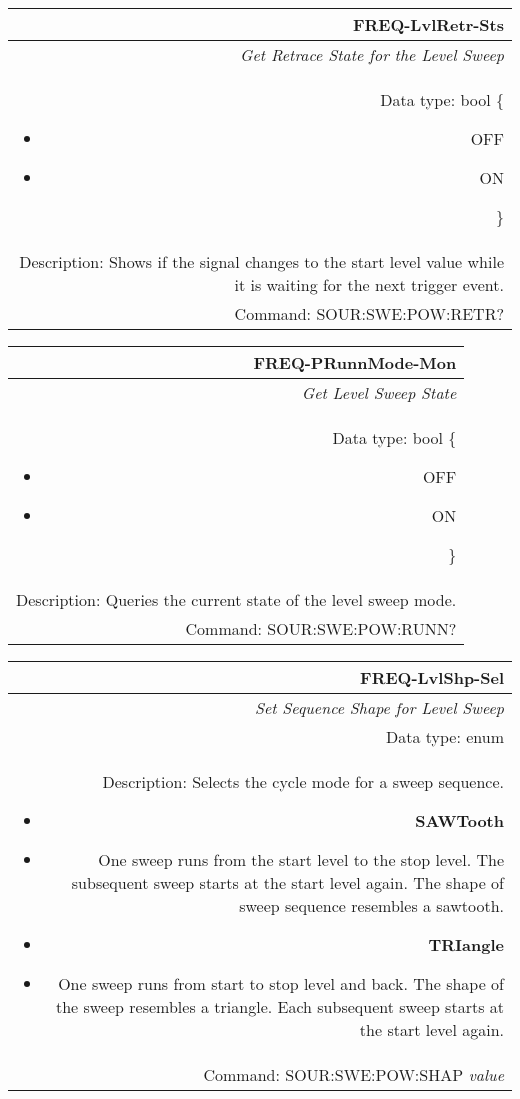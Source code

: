 \documentclass[openany]{article}
\begin{document}
		\begin{tabular}{N}
			\hline
			\bfseries FREQ-LvlRetr-Sts \\ \hline
			\emph{Get Retrace State for the Level Sweep} \\
			Data type: bool \{\begin{itemize}[noitemsep]
				\small
				\item[] OFF
				\item[] ON
			\end{itemize}\} \\
			Description: Shows if the signal changes to the start level value while it is waiting for the next trigger event. \\
			Command: SOUR:SWE:POW:RETR? \\
			
		\end{tabular}
%
		\begin{tabular}{N}
			\hline
			\bfseries FREQ-PRunnMode-Mon \\ \hline
			\emph{Get Level Sweep State} \\
			Data type: bool \{\begin{itemize}[noitemsep]
				\small
				\item[] OFF
				\item[] ON
			\end{itemize}\} \\
			Description: Queries the current state of the level sweep mode. \\
			Command: SOUR:SWE:POW:RUNN? \\
			
		\end{tabular}
%
		\begin{tabular}{N}
			\hline
			\bfseries FREQ-LvlShp-Sel \\ \hline
			\emph{Set Sequence Shape for Level Sweep } \\
			Data type: enum \\
			Description: Selects the cycle mode for a sweep sequence.\begin{itemize}[noitemsep]
				\small
				\item[] \textbf{SAWTooth} 
				\item[] One sweep runs from the start level to the stop level. The subsequent sweep starts at the start level again. The shape of sweep sequence resembles a sawtooth.
				\item[] \textbf{TRIangle}
				\item[] One sweep runs from start to stop level and back. The shape of the sweep resembles a triangle. Each subsequent sweep starts at the start level again.			
			\end{itemize} \\
			Command: SOUR:SWE:POW:SHAP \emph{value} \\

		\end{tabular}
\end{document}
